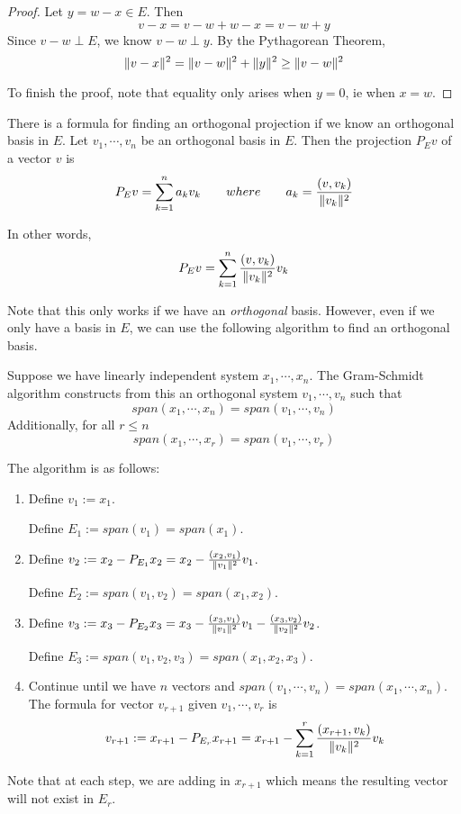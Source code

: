 \begin{proof}
Let $y = w - x \in E$. Then 
$$v - x = v - w + w - x = v - w + y$$
Since $v - w \perp E$, we know $v - w \perp y$. By the Pythagorean Theorem, 
$$\lVert v - x\rVert^{2} = \lVert v - w\rVert^{2} + \lVert y\rVert^{2} \geq \lVert v - w\rVert^{2}$$

To finish the proof, note that equality only arises when $y = 0$, ie when $x = w$. 
\end{proof}

There is a formula for finding an orthogonal projection if we know an orthogonal basis in $E$. Let $v_{1}, \cdots, v_{n}$ be an orthogonal basis in $E$. Then the projection $P_{E} v$ of a vector $v$ is 
$$P_{E} v = \sum_{k=1}^{n} a_{k} v_{k} \qquad where \qquad a_{k} = \frac{(v, v_{k})}{\lVert v_{k}\rVert^{2}}$$

In other words, 
$$P_{E} v = \sum_{k=1}^{n} \frac{(v, v_{k})}{\lVert v_{k}\rVert^{2}} v_{k}$$

Note that this only works if we have an \textit{orthogonal} basis. However, even if we only have a basis in $E$, we can use the following algorithm to find an orthogonal basis. 

\begin{theorem}
Suppose we have linearly independent system $x_{1}, \cdots, x_{n}$. The Gram-Schmidt algorithm constructs from this an orthogonal system $v_{1}, \cdots, v_{n}$ such that 
$$span(x_{1}, \cdots, x_{n}) = span(v_{1}, \cdots, v_{n})$$
Additionally, for all $r \leq n$ 
$$span(x_{1}, \cdots, x_{r}) = span(v_{1}, \cdots, v_{r})$$

The algorithm is as follows: 
\begin{enumerate}
	\item Define $v_{1} := x_{1}$. 
	
	Define $E_{1} := span(v_{1}) = span(x_{1})$. 
	\item Define $v_{2} := x_{2} - P_{E_{1}} x_{2} = x_{2} - \frac{(x_{2}, v_{1})}{\lVert v_{1}\rVert^{2}} v_{1}$. 
	
	Define $E_{2} := span(v_{1}, v_{2}) = span(x_{1}, x_{2})$. 
	\item Define $v_{3} := x_{3} - P_{E_{2}} x_{3} = x_{3} - \frac{(x_{3}, v_{1})}{\lVert v_{1}\rVert^{2}} v_{1} - \frac{(x_{3}, v_{2})}{\lVert v_{2}\rVert^{2}} v_{2}$. 
	
	Define $E_{3} := span(v_{1}, v_{2}, v_{3}) = span(x_{1}, x_{2}, x_{3})$. 
	
	\item Continue until we have $n$ vectors and $span(v_{1}, \cdots, v_{n}) = span(x_{1}, \cdots, x_{n})$. The formula for vector $v_{r + 1}$ given $v_{1}, \cdots, v_{r}$ is 
	$$ v_{r + 1} := x_{r + 1} - P_{E_{r}} x_{r + 1} = x_{r + 1} - \sum_{k = 1}^{r} \frac{(x_{r + 1}, v_{k})}{\lVert v_{k}\rVert^{2}} v_{k}$$
\end{enumerate}

Note that at each step, we are adding in $x_{r + 1}$ which means the resulting vector will not exist in $E_{r}$. 
\end{theorem}


